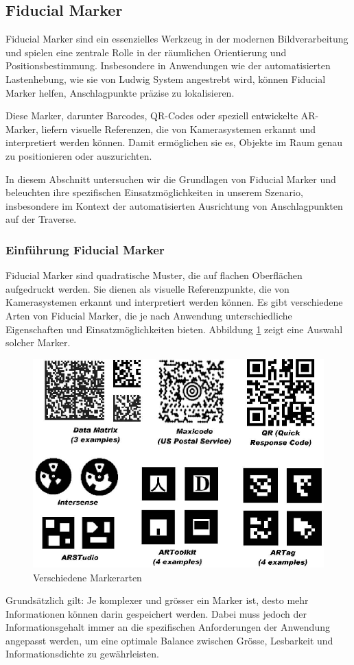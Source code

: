 \subsection{Fiducial Marker}
Fiducial Marker sind ein essenzielles Werkzeug in der modernen Bildverarbeitung und spielen eine 
zentrale Rolle in der räumlichen Orientierung und Positionsbestimmung. Insbesondere in Anwendungen 
wie der automatisierten Lastenhebung, wie sie von Ludwig System angestrebt wird, können Fiducial Marker 
helfen, Anschlagpunkte präzise zu lokalisieren.

Diese Marker, darunter Barcodes, QR-Codes oder speziell entwickelte AR-Marker, liefern visuelle 
Referenzen, die von Kamerasystemen erkannt und interpretiert werden können. Damit ermöglichen sie es, 
Objekte im Raum genau zu positionieren oder auszurichten.

In diesem Abschnitt untersuchen wir die Grundlagen von Fiducial Marker und beleuchten ihre spezifischen 
Einsatzmöglichkeiten in unserem Szenario, insbesondere im Kontext der automatisierten Ausrichtung von 
Anschlagpunkten auf der Traverse.

\subsubsection{Einführung Fiducial Marker}
Fiducial Marker sind quadratische Muster, die auf flachen Oberflächen aufgedruckt werden. 
Sie dienen als visuelle Referenzpunkte, die von Kamerasystemen erkannt und interpretiert 
werden können. Es gibt verschiedene Arten von Fiducial Marker, die je nach Anwendung 
unterschiedliche Eigenschaften und Einsatzmöglichkeiten bieten. 
Abbildung \ref{fig:marker_types} zeigt eine Auswahl solcher Marker.

\begin{figure}[H]
    \centering
    \includegraphics[width=0.5\linewidth]{graphics/marker_arten.png}
    \caption{Verschiedene Markerarten}
    \label{fig:marker_types}
\end{figure}

Grundsätzlich gilt: Je komplexer und grösser ein Marker ist, desto mehr Informationen können
darin gespeichert werden. Dabei muss jedoch der Informationsgehalt immer an die spezifischen 
Anforderungen der Anwendung angepasst werden, um eine optimale Balance zwischen Grösse, Lesbarkeit 
und Informationsdichte zu gewährleisten.

